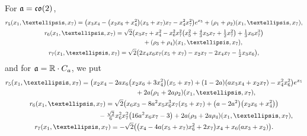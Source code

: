 \documentclass[11pt]{article}
\numberwithin{equation}{section}
\newcommand\fa{{\frak a}}
\newcommand{\fco}{\mathop{{\frak c \frak o}}}
\newcommand\RR{{\mathbb R}}
\begin{document}
For $\fa=\fco(2)$,
\begin{gather*}
r_5(x_1,\dots, x_7) = \big(x_3x_4-\big(x_2x_6+x_4^2\big)(x_5+x_7)x_7-x_4^2x_7^2\big)e^{x_5} +(\rho_1+\rho_2)(x_1,\dots,x_7),\\
r_6(x_1,\dots, x_7) = \sqrt2\big(x_3x_7+x_4^2-x_6^2x_7^2\big(x_5^2+\tfrac43 x_5x_7+\tfrac12x_7^2\big)+\tfrac13x_6x_7^3\big) \\
\hphantom{r_6(x_1,\dots, x_7) =}{} +(\rho_3+\rho_4)(x_1,\dots,x_7) ,\\
r_7(x_1,\dots, x_7) = \sqrt2\big(2x_4x_6x_7(x_5+x_7)-x_2x_7-2x_4x_7-\tfrac12 x_3x_6\big),
\end{gather*}
and for $\fa=\RR\cdot C_a$, we put
\begin{gather*}
r_5(x_1,\dots, x_7) = \big(x_2x_4-2ax_6\big(x_2x_6+3x_4^2\big)(x_5+x_7)+(1 - 2a)(ax_3x_4+x_2x_7)-x_4^2x_6^2\big)e^{x_5} \\
 \hphantom{r_5(x_1,\dots, x_7) =}{} +2a(\rho_1+2a\rho_2)(x_1,\dots, x_7),\\
r_6(x_1,\dots, x_7) = \sqrt2\big(x_6x_3-8a^2x_5x_6^3x_7(x_5+x_7)+\big(a-2a^2\big)\big(x_2x_6+x_4^2\big)\big) \\
 \hphantom{r_6(x_1,\dots, x_7) =}{} -\tfrac{\sqrt2}6x_6^2x_7^2\big(16a^2x_6x_7-3\big) +2a(\rho_3+2a\rho_4)(x_1,\dots, x_7),\\
r_7(x_1,\dots, x_7) = -\sqrt 2\big(\big(x_4-4a(x_5+x_7)x_6^2+2x_7\big)x_4+x_6(ax_3+x_2)\big).
\end{gather*}
\end{document}
